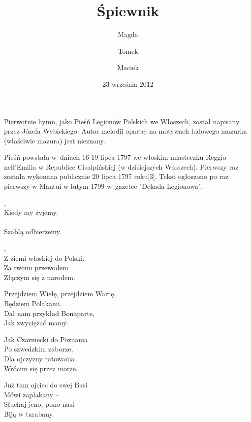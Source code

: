 \documentclass[12pt,a4paper,twoside]{songbook}
\title{Śpiewnik}
\date{23 września 2012}
\author{Magda \and Tomek \and Maciek}
\begin{document}
\maketitle
{}


  \begin{info}
    Pierwotnie hymn, jako Pieśń Legionów Polskich we Włoszech, został
    napisany przez Józefa Wybickiego. Autor melodii opartej na motywach
    ludowego mazurka (właściwie mazura) jest nieznany.

    Pieśń powstała w~dniach 16-19 lipca 1797 we włoskim miasteczku
    Reggio nell'Emilia w Republice Cisalpińskiej (w dzisiejszych
    Włoszech). Pierwszy raz została wykonana publicznie 20 lipca 1797
    roku[3]. Tekst ogłoszono po raz pierwszy w Mantui w lutym 1799
    w~gazetce "Dekada Legionowa".
  \end{info}
  
  \begin{lyrics}
    ,\\
    Kiedy my żyjemy.\\
    \\
    Szablą odbierzemy.
    
    \begin{chorus}
      ,\\
      Z ziemi włoskiej do Polski.\\
      Za twoim przewodem\\
      Złączym się z narodem.
    \end{chorus}
    
    Przejdziem Wisłę, przejdziem Wartę,\\
    Będziem Polakami.\\
    Dał nam przykład Bonaparte,\\
    Jak zwyciężać mamy.
    
    \chorusref
    
    Jak Czarniecki do Poznania\\
    Po szwedzkim zaborze,\\
    Dla ojczyzny ratowania\\
    Wrócim się przez morze.
        
    \chorusref

    Już tam ojciec do swej Basi\\
    Mówi zapłakany --\\
    Słuchaj jeno, pono nasi\\
    Biją w tarabany.

    \chorusref
  \end{lyrics}
\end{document}
